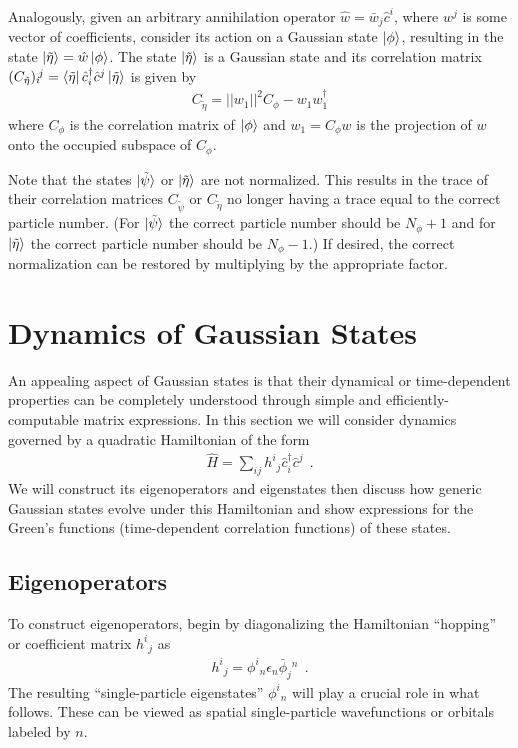 \documentclass[aps, superscriptaddress, floatfix, onecolumn]{revtex4-2}
\begin{document}
Analogously, given an arbitrary annihilation operator $\hat{w} = \bar{w}_j \hat{c}^i$, where $w^j$ is some vector of coefficients, consider its action on a Gaussian state $\ket{\phi}$, resulting in the state $\ket{\tilde{\eta}} = \hat{w} \ket{\phi}$.
The state $\ket{\tilde{\eta}}$ is a Gaussian state and its correlation matrix $( C_{\tilde{\eta}})_i\!^j = \bra{\tilde{\eta}} \hat{c}^\dagger_i \hat{c}^j \ket{\tilde{\eta}}$  is given by 
\begin{align}
\boxed{C_{\tilde{\eta}} = ||w_1||^2 C_\phi - w_1 w_1^\dagger}
\end{align}
where $C_\phi$ is the correlation matrix of $\ket{\phi}$ and $w_1 = C_\phi w$ is the projection of $w$ onto the occupied subspace of $C_\phi$.

Note that the states $\ket{\tilde{\psi}}$ or $\ket{\tilde{\eta}}$ are not normalized. This results in the trace of their correlation matrices $C_{\tilde{\psi}}$ or $C_{\tilde{\eta}}$ no longer having a trace equal to the correct particle number. (For $\ket{\tilde{\psi}}$ the correct particle number should be $N_\phi + 1$ and for $\ket{\tilde{\eta}}$ the correct particle number should be $N_\phi-1$.) If desired, the correct normalization can be restored by multiplying by the appropriate factor.

\section{Dynamics of Gaussian States}

An appealing aspect of Gaussian states is that their dynamical or time-dependent properties can be completely understood through simple and efficiently- computable matrix expressions. In this section we will consider dynamics governed by a quadratic Hamiltonian of the form 
\begin{align}
\hat{H} = \sum_{ij} h^i\!_j \hat{c}^\dagger_i \hat{c}^j \ \ .
\end{align} 
We will construct its eigenoperators and eigenstates then discuss how generic Gaussian states evolve under this Hamiltonian and show expressions for the Green's functions (time-dependent correlation functions) of these states.

\subsection{Eigenoperators}

To construct eigenoperators, begin by diagonalizing the Hamiltonian ``hopping'' or coefficient matrix $h^i\!_j$ as
\begin{align}
h^i\!_j = \phi^i\!_n \epsilon_n \bar{\phi}_j\!^n \ \ .
\end{align}
The resulting ``single-particle eigenstates'' $\phi^i\!_n$ will play a crucial role in what follows. These can be viewed as spatial single-particle wavefunctions or orbitals labeled by $n$.
\end{document}
